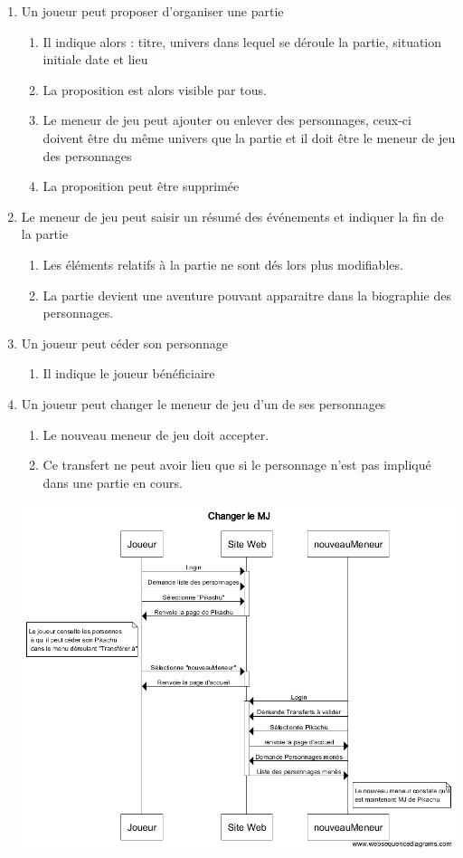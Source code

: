 \documentclass[a4paper, 11pt, titlepage]{article}
\begin{document}
\begin{enumerate}
    \item Un joueur peut proposer d'organiser une partie
    \begin{enumerate}
        \item  Il indique alors : titre, univers dans lequel se déroule la partie, situation initiale date et lieu
        \item La proposition est alors visible par tous.
        \item Le meneur de jeu peut ajouter ou enlever des personnages, ceux-ci doivent être du même univers que la partie et il doit être le meneur de jeu des personnages
        \item La proposition peut être supprimée
    \end{enumerate}
    \item Le meneur de jeu peut saisir un résumé des événements et indiquer la fin de la partie
    \begin{enumerate}
        \item Les éléments relatifs à la partie ne sont dés lors plus modifiables.
        \item La partie devient une aventure pouvant apparaitre dans la biographie des personnages.
    \end{enumerate}
    \item Un joueur peut céder son personnage
    \begin{enumerate}
        \item Il indique le joueur bénéficiaire
    \end{enumerate}
    \item Un joueur peut changer le meneur de jeu d'un de ses personnages
    \begin{enumerate}
        \item Le nouveau meneur de jeu doit accepter.
        \item Ce transfert ne peut avoir lieu que si le personnage n'est pas impliqué dans une partie en cours.
    \end{enumerate}
    \includegraphics[scale=0.5]{sequence/ChangerleMJ.png}
    \end{enumerate}
\end{document}
